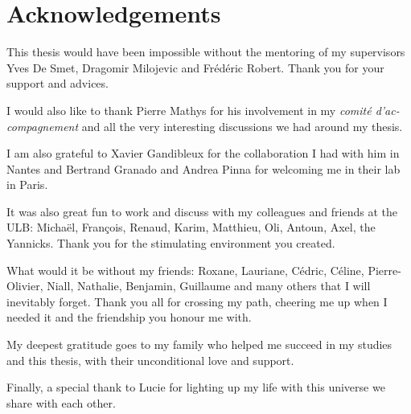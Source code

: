 \chapter{Acknowledgements}

This thesis would have been impossible without the mentoring of my supervisors Yves De Smet, Dragomir Milojevic and Frédéric Robert. Thank you for your support and advices.

I would also like to thank Pierre Mathys for his involvement in my \textit{comité d'ac-compagnement} and all the very interesting discussions we had around my thesis.

I am also grateful to Xavier Gandibleux for the collaboration I had with him in Nantes and Bertrand Granado and Andrea Pinna for welcoming me in their lab in Paris.

It was also great fun to work and discuss with my colleagues and friends at the ULB: Michaël, François, Renaud, Karim, Matthieu, Oli, Antoun, Axel, the Yannicks. Thank you for the stimulating environment you created.

What would it be without my friends: Roxane, Lauriane, Cédric, Céline, Pierre-Olivier, Niall, Nathalie, Benjamin, Guillaume and many others that I will inevitably forget. Thank you all for crossing my path, cheering me up when I needed it and the friendship you honour me with.

My deepest gratitude goes to my family who helped me succeed in my studies and this thesis, with their unconditional love and support.

Finally, a special thank to Lucie for lighting up my life with this universe we share with each other.